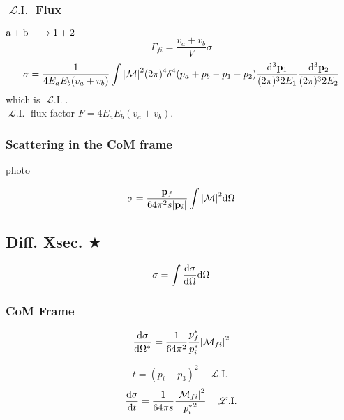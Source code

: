 \documentclass[a4paper]{article}
\DeclareMathOperator{\LI}{\mathscr{L}.I.}
\numberwithin{equation}{section}
\begin{document}
\subsubsection{$ \LI $ Flux}
$ \ce{a + b -> 1 + 2} $
\begin{equation}\label{key}
\Gamma_{fi} = \dfrac{v_a + v_b}{V}\sigma
\end{equation}
\begin{equation}\label{key}
\sigma = \dfrac{1}{4E_aE_b(v_a + v_b)} \int \abs{\mathcal{M}}^2 (2\pi)^4 \delta^4(p_a + p_b- p_1 - p_2) \dfrac{\dd[3]\vb{p}_1}{(2\pi)^3 2E_1} \dfrac{\dd[3]\vb{p}_2}{(2\pi)^3 2E_2}
\end{equation}
which is $ \LI $.\\
$ \LI $ flux factor $ F = 4E_aE_b(v_a + v_b) $.

\subsubsection{Scattering in the CoM frame}
photo

\begin{equation}\label{key}
\sigma = \dfrac{\abs{\vb{p}_f}}{64\pi^2 s\abs{\vb{p}_i}} \int \abs{\mathcal{M}}^2 \dd\Omega
\end{equation}

\subsection{Diff. Xsec. $ \bigstar $}
\begin{equation}\label{key}
\sigma = \int\dv{\sigma}{\Omega}\dd\Omega
\end{equation}
\subsubsection{CoM Frame}
\begin{equation}\label{key}
\dv{\sigma}{\Omega^*} = \dfrac{1}{64\pi^2}\dfrac{p_f^*}{p_i^*} \abs{\mathcal{M}_{fi}}^2
\end{equation}

\begin{equation}\label{key}
t = (p_i - p_3)^2   \quad \LI
\end{equation}
\begin{equation}\label{key}
\dv{\sigma}{t} = \dfrac{1}{64\pi s} \dfrac{\abs{\mathcal{M}_{fi}}^2}{{p_i^*}^2}  \quad \LI
\end{equation}
\end{document}
